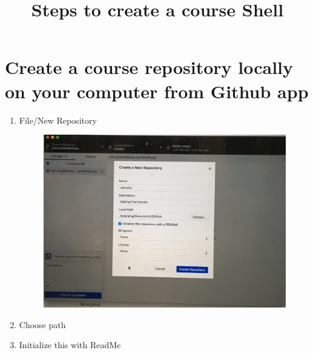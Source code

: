 \documentclass{ximera}
\title{Steps to create a course Shell }
\begin{document}
\begin{abstract}
\end{abstract}
\maketitle

\section{Create a course repository locally on your computer from Github app}
\begin{enumerate}
\item File/New Repository
\begin{center}
\begin{figure}[h!]
\includegraphics[scale=.1]{images/x1}
\end{figure}
\end{center}
\item	Choose path
\item Initialize this with ReadMe
\end{enumerate}
\end{document}

